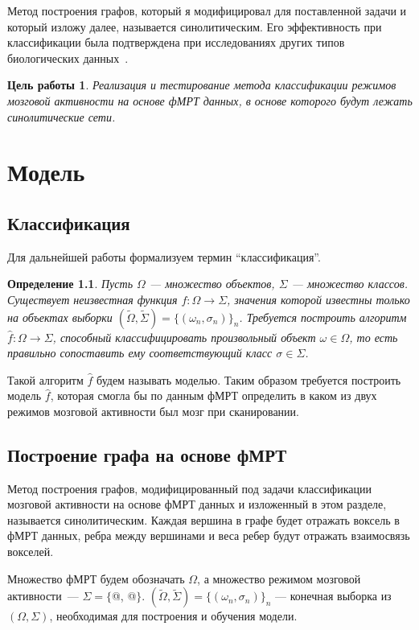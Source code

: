 \documentclass[specialist,
substylefile = spbu_report.rtx,
subf,href,colorlinks=true, 12pt]{disser}
\makeatletter
\newcommand*{\rom}[1]{\expandafter\@slowromancap\romannumeral #1@}
\newtheorem{defenition}{Определение}
\newtheorem*{purpose*}{Цель работы}
\makeatother
\begin{document}
			Метод построения графов, который я модифицировал для поставленной задачи и который изложу далее, называется синолитическим. Его эффективность при классификации была подтверждена при исследованиях других типов биологических данных~\cite{DemichevV2022, Krivonosov2020}.						
		
			\begin{purpose*}
				Реализация и тестирование метода классификации режимов мозговой активности на основе фМРТ данных, в основе которого будут лежать синолитические сети.
			\end{purpose*}				
		
	\chapter{Модель}	
		\section{Классификация}
		Для дальнейшей работы формализуем термин “классификация”. 
		\begin{defenition}
			Пусть $\Omega$ --- множество объектов, $\Sigma$ --- множество классов. Существует неизвестная функция $f: \Omega \rightarrow \Sigma$, значения которой известны только на объектах выборки $(\widetilde{\Omega}, \widetilde{\Sigma}) =  \{(\omega_{n}, \sigma_{n})\}_n$. Требуется построить алгоритм $\widehat{f}: \Omega \rightarrow \Sigma$, способный классифицировать произвольный объект $\omega \in \Omega$, то есть правильно сопоставить ему соответствующий класс $\sigma \in \Sigma$.
		\end{defenition}
		
		Такой алгоритм $\widehat{f}$ будем называть моделью. Таким образом требуется построить модель $\widehat{f}$, которая смогла бы по данным фМРТ определить в каком из двух режимов мозговой активности был мозг при сканировании.								
		
		\section{Построение графа на основе фМРТ}
			Метод построения графов, модифицированный под задачи классификации мозговой активности на основе фМРТ данных и изложенный в этом разделе, называется синолитическим. Каждая вершина в графе будет отражать воксель в фМРТ данных, ребра между вершинами и веса ребер будут отражать взаимосвязь вокселей. 		
			
			Множество фМРТ будем обозначать $\Omega$, а множество режимом мозговой активности~--- $\Sigma = \{$\rom{1}, \rom{2}$\}$. $(\widetilde{\Omega}, \widetilde{\Sigma}) =  \{(\omega_{n}, \sigma_{n})\}_n$ --- конечная выборка из $(\Omega, \Sigma)$, необходимая для построения и обучения модели.	
			
\end{document}
